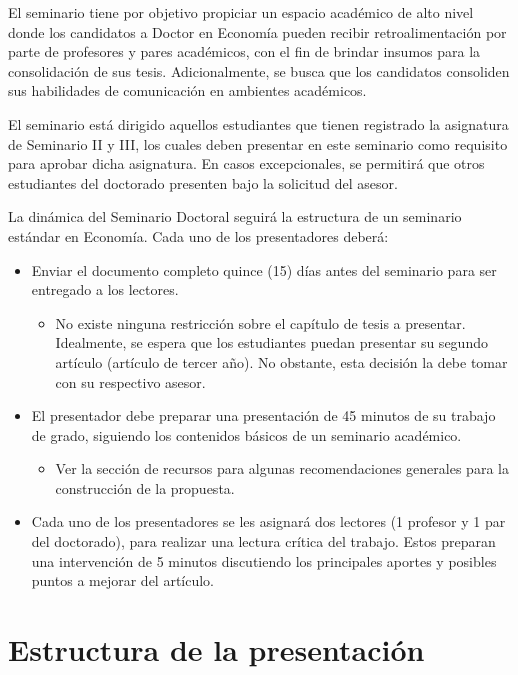 El seminario tiene por objetivo propiciar un espacio académico de alto nivel donde los candidatos a Doctor en Economía pueden recibir retroalimentación por parte de profesores y pares académicos, con el fin de brindar insumos para la consolidación de sus tesis. Adicionalmente, se busca que los candidatos consoliden sus habilidades de comunicación en ambientes académicos.

El seminario está dirigido aquellos estudiantes que tienen registrado la asignatura de Seminario II y III, los cuales deben presentar en este seminario como requisito para aprobar dicha asignatura. En casos excepcionales, se permitirá que otros estudiantes del doctorado presenten bajo la solicitud del asesor.

La dinámica del Seminario Doctoral seguirá la estructura de un seminario estándar en Economía. Cada uno de los presentadores deberá:
\begin{itemize}
    \item Enviar el documento completo quince (15) días antes del seminario para ser entregado a los lectores. 
    \begin{itemize}
        \item No existe ninguna restricción sobre el capítulo de tesis a presentar. Idealmente, se espera que los estudiantes puedan presentar su segundo artículo (artículo de tercer año). No obstante, esta decisión la debe tomar con su respectivo asesor.
    \end{itemize}
    \item El presentador debe preparar una presentación de 45 minutos de su trabajo de grado, siguiendo los contenidos básicos de un seminario académico. 
    \begin{itemize}
        \item  Ver la sección de recursos para algunas recomendaciones generales para la construcción de la propuesta.
    \end{itemize}

    \item Cada uno de los presentadores se les asignará dos lectores (1 profesor y 1 par del doctorado), para realizar una lectura crítica del trabajo. Estos preparan una intervención de 5 minutos discutiendo los principales aportes y posibles puntos a mejorar del artículo. 
\end{itemize}

\section{Estructura de la presentación}

